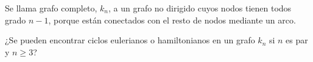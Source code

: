 Se llama grafo completo, $k_n$, a un grafo no dirigido cuyos nodos tienen todos grado $n-1$, porque están conectados con el resto de nodos mediante un arco.

¿Se pueden encontrar ciclos eulerianos o hamiltonianos en un grafo $k_n$ si $n$ es par y $n \geq 3$?